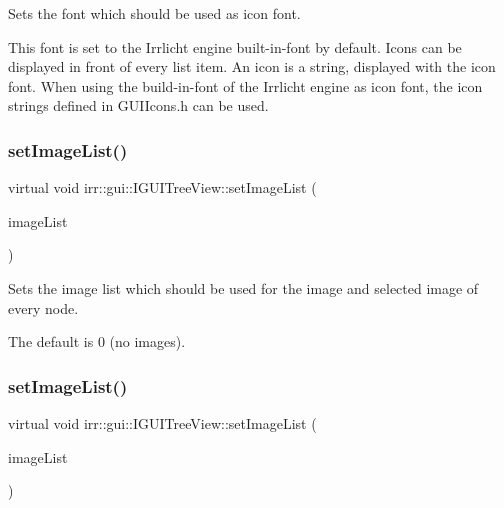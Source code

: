 Sets the font which should be used as icon font. 

This font is set to the Irrlicht engine built-\/in-\/font by default. Icons can be displayed in front of every list item. An icon is a string, displayed with the icon font. When using the build-\/in-\/font of the Irrlicht engine as icon font, the icon strings defined in G\+U\+I\+Icons.\+h can be used. \mbox{\label{classirr_1_1gui_1_1IGUITreeView_aaa55170154f44d17e2a8129368c1a010}} 
\subsubsection{\texorpdfstring{set\+Image\+List()}{setImageList()}\hspace{0.1cm}{\footnotesize\ttfamily [1/2]}}
{\footnotesize\ttfamily virtual void irr\+::gui\+::\+I\+G\+U\+I\+Tree\+View\+::set\+Image\+List (\begin{DoxyParamCaption}\item[{\hyperlink{classirr_1_1gui_1_1IGUIImageList}{I\+G\+U\+I\+Image\+List} $\ast$}]{image\+List }\end{DoxyParamCaption})\hspace{0.3cm}{\ttfamily [pure virtual]}}



Sets the image list which should be used for the image and selected image of every node. 

The default is 0 (no images). \mbox{\label{classirr_1_1gui_1_1IGUITreeView_aaa55170154f44d17e2a8129368c1a010}} 
\subsubsection{\texorpdfstring{set\+Image\+List()}{setImageList()}\hspace{0.1cm}{\footnotesize\ttfamily [2/2]}}
{\footnotesize\ttfamily virtual void irr\+::gui\+::\+I\+G\+U\+I\+Tree\+View\+::set\+Image\+List (\begin{DoxyParamCaption}\item[{\hyperlink{classirr_1_1gui_1_1IGUIImageList}{I\+G\+U\+I\+Image\+List} $\ast$}]{image\+List }\end{DoxyParamCaption})\hspace{0.3cm}{\ttfamily [pure virtual]}}



